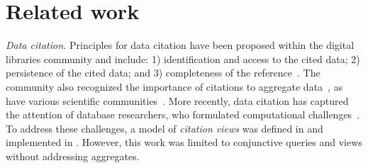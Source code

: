 \section{Related work}\label{Sec: related_work}

{\em Data citation.} Principles for data citation have been proposed within the digital libraries community\cite{CODATA2013,FORCE11_2104} 
and include: 1) identification and access to the cited data; 2) persistence of the cited data; and 3) completeness of the reference~\cite{Klump2015,Simons12,BraseSL15,DataCite2016}. 
The community also recognized the importance of citations to aggregate data~\cite{CODATA2013}, as have various scientific communities~\cite{harrow2012gencode, himmelstein2017systematic, mcentyre2015biostudies}. 
More recently, data citation has captured the attention of database researchers, who formulated computational challenges~\cite{BunemanEtAl2016, DBLP:conf/pods/DavidsonBDMS17}.
To address these challenges, a model of {\em citation views} was defined in \cite{davidson2017model} and implemented in \cite{alawini2017automating,wu2018data}.  However, this work was limited to conjunctive queries and views without addressing aggregates. 


